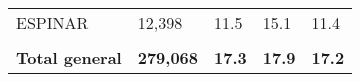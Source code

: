 \begin{tabular}{lllll}
	\cellcolor[HTML]{FF5050}ESPINAR                                & 12,398                                                                & 11.5                                                                             & 15.1                                                                        & 11.4                                                                                \\
	&                                                                       &                                                                                  &                                                                             &                                                                                     \\
	\rowcolor[HTML]{DDEBF7} 
	\textbf{Total   general}                                       & \textbf{279,068}                                                      & \textbf{17.3}                                                                    & \textbf{17.9}                                                               & \textbf{17.2}                                                                      
\end{tabular}